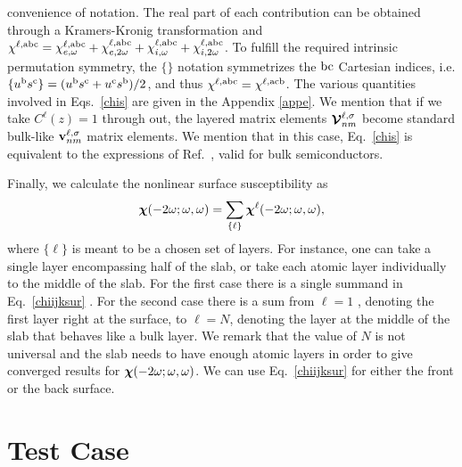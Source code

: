 \documentclass[floatfix,prb,aps,superscriptaddress,11pt,preprint,letterpaper]{revtex4}
\def\chon{black}
\begin{document}
{\color{\chon} convenience of notation}.
The real part of each contribution can be obtained through
a Kramers-Kronig transformation\cite{nicolas} {\color{\chon} and}
$\chi^{\ell,\mathrm{a}\mathrm{b}\mathrm{c}}=
\chi^{\ell,\mathrm{a}\mathrm{b}\mathrm{c}}_{e,\omega} 
+\chi^{\ell,\mathrm{a}\mathrm{b}\mathrm{c}}_{e,2\omega}
+\chi^{\ell,\mathrm{a}\mathrm{b}\mathrm{c}}_{i,\omega} 
+\chi^{\ell,\mathrm{a}\mathrm{b}\mathrm{c}}_{i,2\omega}
$.
To fulfill the required intrinsic permutation symmetry, %
the $\{\}$ notation symmetrizes the $\mathrm{b}\mathrm{c}$ Cartesian indices, i.e. 
$\{u^{\mathrm{b}}s^{\mathrm{c}}\}=(u^{\mathrm{b}}s^{\mathrm{c}}+u^{\mathrm{c}}s^{\mathrm{b}})/2$,
and thus
$\chi^{\ell,\mathrm{a}\mathrm{b}\mathrm{c}}=\chi^{\ell,\mathrm{a}\mathrm{c}\mathrm{b}}$.
The various quantities involved in Eqs.~\eqref{chis} are given in
the Appendix \ref{appe}. 
We mention that if we take $C^\ell(z)=1$ through out, the layered
matrix elements $\boldsymbol{\mathcal{\cal V}}^{\ell,\sigma}_{nm}$ become standard bulk-like
$\mathbf{v}^{\ell,\sigma}_{nm}$ matrix elements. We mention that in this
case, Eq.~\eqref{chis} is equivalent to the expressions of
Ref.~, valid for bulk semiconductors.
 
Finally, we calculate the nonlinear surface susceptibility as 
\begin{equation}\label{chiijksur}
\boldsymbol{\chi}(-2\omega;\omega,\omega)
= \sum_{\{\ell\}}\boldsymbol{\chi}^{\ell}(-2\omega;\omega,\omega),
\end{equation} 
where $\{\ell\}$
is meant to be {\color{\chon} a chosen set of layers.} For instance, 
one {\color{\chon} can take a single layer 
encompassing} half of the slab, or {\color{\chon} take each 
atomic layer individually to the middle} 
of the slab. {\color{\chon} For} the first case there is 
{\color{\chon} a} single summand
in Eq.~\eqref{chiijksur}{\color{\chon} . For the second case
there is} a sum from $\ell=1${\color{\chon} , denoting the first layer 
right at the surface, to $\ell=N$, denoting the layer at the middle of the slab 
that behaves like a bulk layer.}
We {\color{\chon} remark} that the value of 
$N$ is not universal {\color{\chon} and} 
the slab needs to have enough atomic layers 
{\color{\chon} in} order to give converged results for 
$\boldsymbol{\chi} (-2\omega;\omega,\omega)$. 
We can use Eq.~\eqref{chiijksur} for 
either the front or the back surface. 

\section{Test Case}\label{results}
\end{document}

